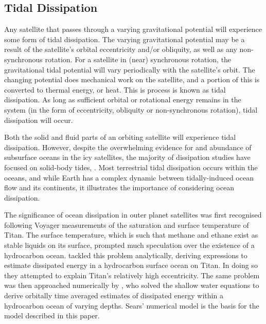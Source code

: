 \subsection{Tidal Dissipation}

Any satellite that passes through a varying gravitational potential will experience some form of tidal dissipation. The varying gravitational potential may be a result of the satellite's orbital eccentricity and/or obliquity, as well as any non-synchronous rotation. For a satellite in (near) synchronous rotation, the gravitational tidal potential will vary periodically with the satellite's orbit. The changing potential does mechanical work on the satellite, and a portion of this is converted to thermal energy, or heat. This is process is known as tidal dissipation. As long as sufficient orbital or rotational energy remains in the system (in the form of eccentricity, obliquity or non-synchronous rotation), tidal dissipation will occur.

Both the solid and fluid parts of an orbiting satellite will experience tidal dissipation. 
However, despite the overwhelming evidence for and abundance of subsurface oceans in the icy satellites, the majority of dissipation studies have focused on solid-body tides, \citep[e.g.,][]{moore2000tidal, tobie2005tidal,roberts2008tidal, beuthe2013spatial}.
Most terrestrial tidal dissipation occurs within the oceans, and while Earth has a complex dynamic between tidally-induced ocean flow and its continents, it illustrates the importance of considering ocean dissipation.

The significance of ocean dissipation in outer planet satellites was first recognised following Voyager measurements of the saturation and surface temperature of Titan. The surface temperature, which is such that methane and ethane exist as stable liquids on its surface, prompted much speculation over the existence of a hydrocarbon ocean. \citet{sagan1982tide} tackled this problem analytically, deriving expressions to estimate dissipated energy in a hydrocarbon surface ocean on Titan. In doing so they attempted to explain Titan's relatively high eccentricity. The same problem was then approached numerically by \citet{sears1995tidal}, who solved the shallow water equations to derive orbitally time averaged estimates of dissipated energy within a hydrocarbon ocean of varying depths. Sears' numerical model is the basis for the model described in this paper.


